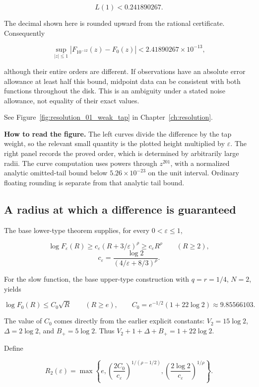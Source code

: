 \[
L(1)<0.241890267.
\]

The decimal shown here is rounded upward from the rational certificate.
Consequently

\[
\boxed{\sup_{|z|\le1}|F_{10^{-12}}(z)-F_0(z)|<2.41890267\times10^{-13},}
\]

although their entire orders are different. If observations have an
absolute error allowance at least half this bound, midpoint data can be
consistent with both functions throughout the disk. This is an ambiguity
under a stated noise allowance, not equality of their exact values.

See Figure~\ref{fig:resolution_01_weak_tap} in Chapter~\ref{ch:resolution}.

\textbf{How to read the figure.} The left curves divide the difference
by the tap weight, so the relevant small quantity is the plotted height
multiplied by \(\varepsilon\). The right panel records the proved order,
which is determined by arbitrarily large radii. The curve computation
uses powers through \(z^{201}\), with a normalized analytic omitted-tail
bound below \(5.26\times10^{-23}\) on the unit interval. Ordinary
floating rounding is separate from that analytic tail bound.

\hypertarget{v11-resolution_full-a-radius-at-which-a-difference-is-guaranteed}{%
\subsection{A radius at which a difference is
guaranteed}\label{v11-resolution_full-a-radius-at-which-a-difference-is-guaranteed}}

The base lower-type theorem supplies, for every \(0<\varepsilon\le1\),

\[
\log F_\varepsilon(R)\ge c_\varepsilon(R+3/\varepsilon)^\rho
\ge c_\varepsilon R^\rho\qquad(R\ge2),
\] \[
c_\varepsilon=\frac{\log2}{(4/\varepsilon+8/3)^\rho}.
\]

For the slow function, the base upper-type construction with
\(q=r=1/4\), \(N=2\), yields

\[
\log F_0(R)\le C_0\sqrt R\qquad(R\ge e),
\qquad C_0=e^{-1/2}(1+22\log2)\approx9.85566103.
\]

The value of \(C_0\) comes directly from the earlier explicit constants:
\(V_2=15\log2\), \(\Delta=2\log2\), and \(B_+=5\log2\). Thus
\(V_2+1+\Delta+B_+=1+22\log2\).

Define

\[
R_2(\varepsilon)=\max\left\{
 e,\left(\frac{2C_0}{c_\varepsilon}\right)^{1/(\rho-1/2)},
 \left(\frac{2\log2}{c_\varepsilon}\right)^{1/\rho}\right\}.
\tag{RA-3}
\]

